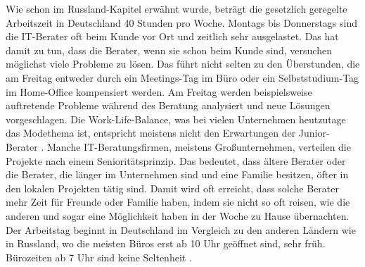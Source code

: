	Wie schon im Russland-Kapitel erwähnt wurde, beträgt die gesetzlich geregelte Arbeitszeit in Deutschland 40 Stunden pro Woche. Montags bis Donnerstags sind die IT-Berater oft beim Kunde vor Ort und zeitlich sehr ausgelastet. Das hat damit zu tun, dass die Berater, wenn sie schon beim Kunde sind, versuchen möglichst viele Probleme zu lösen. Das führt nicht selten zu den Überstunden, die am Freitag entweder durch ein Meetings-Tag im Büro oder ein Selbststudium-Tag im Home-Office kompensiert werden. Am Freitag werden beispielsweise auftretende Probleme während des Beratung analysiert und neue Lösungen vorgeschlagen. Die Work-Life-Balance, was bei vielen Unternehmen heutzutage das Modethema ist, entspricht meistens nicht den Erwartungen der Junior-Berater \cite{JNRBer}. 
	Manche IT-Beratungsfirmen, meistens Großunternehmen, verteilen die Projekte nach einem Senioritätsprinzip. Das bedeutet, dass ältere Berater oder die Berater, die länger im Unternehmen sind und eine Familie besitzen, öfter in den lokalen Projekten tätig sind. Damit wird oft erreicht, dass solche Berater mehr Zeit für Freunde oder Familie haben, indem sie nicht so oft reisen, wie die anderen und sogar eine Möglichkeit haben in der Woche zu Hause übernachten.\\
	Der Arbeitstag beginnt in Deutschland im Vergleich zu den anderen Ländern wie in Russland, wo die meisten Büros erst ab 10 Uhr geöffnet sind, sehr früh. Bürozeiten ab 7 Uhr sind keine Seltenheit \cite{ArbKulturDE}. %
	
